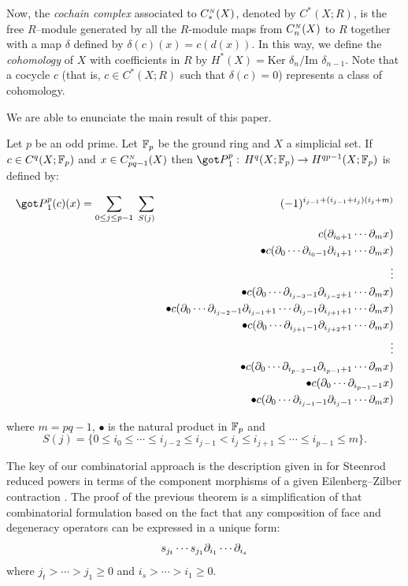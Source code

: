Now, the {\em cochain complex} associated to $C_*^{\scriptscriptstyle N}(X)$, denoted
by $C^*(X;R)$, is the free $R$--module generated by all the
$R$-module maps from $C_n^{\scriptscriptstyle N}(X)$ to $R$ together with a map
$\delta$ defined by $\delta(c)(x)=c(d(x))$.
In this way, we
define the {\em cohomology} of $X$ with coefficients in $R$
by $H^*(X)=$Ker $\delta_n/$Im $\delta_{n-1}$. Note that a
cocycle $c$ (that is, $c\in C^*(X;R)$ such that $\delta(c)=0$)
represents a class of cohomology.

  We are able to enunciate the main result of this paper.


\vspace{0.5cm}

\begin{thr} Let $p$ be an odd prime. Let ${\Bbb F}_p$ be the ground
ring and $X$ a simplicial set. If $c\in C^q(X;{\Bbb F}_p)$
and $x\in C_{pq-1}^{\scriptscriptstyle N}(X)$ then
${\got P}_1^p:\, H^q(X;\Fp)\ra H^{qp-1}(X;\Fp)$ is defined
by:

\begin{eqnarray*}
{\got P}_1^p(c)(x)=\sum_{0\leq j\leq p-1}\;\sum_{S(j)}&&
(-1)^{i_{j-1}+(i_{j-1}+i_j)(i_j+m)}\\
&&c(\pa_{i_0+1}\cdots\pa_mx)\\
&&\bullet c(\pa_0\cdots\pa_{i_0-1}\pa_{i_1+1}\cdots\pa_mx)\\
&&\vdots\\
&&\bullet c(\pa_0\cdots\pa_{i_{j-3}-1}\pa_{i_{j-2}+1}\cdots\pa_mx)\\
&&\bullet c(\pa_0\cdots\pa_{i_{j-2}-1}\pa_{i_{j-1}+1}\cdots\pa_{i_j-1}
\pa_{i_{j+1}+1}\cdots\pa_mx)\\
&&\bullet c(\pa_0\cdots\pa_{i_{j+1}-1}\pa_{i_{j+2}+1}\cdots\pa_mx)\\
&&\vdots\\
&&\bullet c(\pa_0\cdots\pa_{i_{p-2}-1}\pa_{i_{p-1}+1}\cdots\pa_mx)\\
&&\bullet c(\pa_0\cdots\pa_{i_{p-1}-1}x)\\
&&\bullet c(\pa_0\cdots\pa_{i_{j-1}-1}\pa_{i_j-1}\cdots \pa_mx)
\end{eqnarray*}

\noindent where $m=pq-1$, $\bullet$ is the natural product in ${\Bbb F}_p$ and
$$S(j)=\{0\leq i_0\leq \cdots\leq i_{j-2}\leq i_{j-1}<i_j\leq
i_{j+1}\leq\cdots \leq i_{p-1}\leq m\}.$$
\end{thr}

 The key of our combinatorial approach is the description given
 in \cite{jpaa}
 for Steenrod reduced powers in terms of
the component morphisms of a given Eilenberg--Zilber
contraction \cite{EZ59}. The proof of the previous theorem is
a simplification of that combinatorial formulation based
on the fact that any composition of face
and degeneracy operators can be expressed in a unique form:
$$s_{j_t}\cdots s_{j_1}\partial_{i_1}\cdots\partial_{i_s}$$
where $j_t>\cdots>j_1\geq 0$ and $i_s>\cdots>i_1\geq 0$.


